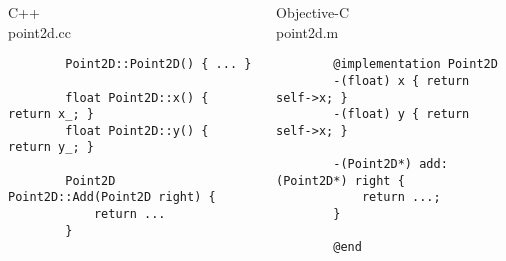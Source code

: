 \documentclass[brazil]{beamer}
\begin{document}
\begin{frame}[fragile]
  \begin{columns}
    \begin{column}{.5\textwidth}
      \begin{center}
        C++ \\
        point2d.cc
      \end{center}
      \lstset{language=C++,basicstyle=\tiny}
      \begin{lstlisting}
        Point2D::Point2D() { ... }

        float Point2D::x() { return x_; }
        float Point2D::y() { return y_; }

        Point2D Point2D::Add(Point2D right) {
            return ...
        }
      \end{lstlisting}
    \end{column}
    \begin{column}{.5\textwidth}
      \begin{center}
        Objective-C \\
        point2d.m
      \end{center}
      \lstset{language=C++,basicstyle=\tiny}
      \begin{lstlisting}
        @implementation Point2D
        -(float) x { return self->x; }
        -(float) y { return self->x; }

        -(Point2D*) add: (Point2D*) right {
            return ...;
        }

        @end
      \end{lstlisting}
    \end{column}
  \end{columns}
\end{frame}
\end{document}

